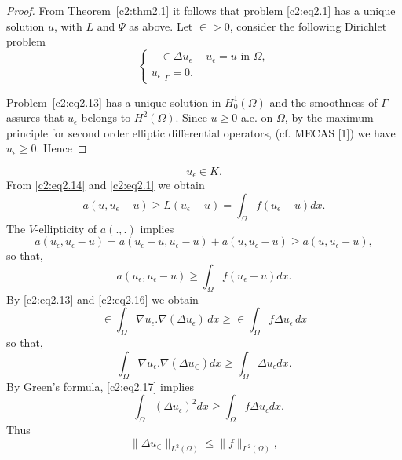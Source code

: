 \begin{proof}
From Theorem~\ref{c2:thm2.1} it follows that problem \eqref{c2:eq2.1}
has a unique solution 
$u$, with $L$ and $\Psi$ as above. Let $\in > 0$, consider the
following Dirichlet problem  
\begin{equation}
\begin{cases}
- \in \Delta u_\epsilon  + u_\epsilon =  u \text { in } \Omega,\\
u_\epsilon |_\Gamma = 0.
\end{cases}\tag{2.13}\label{c2:eq2.13} 
\end{equation}

Problem~\eqref{c2:eq2.13} has a unique solution in $H^1_0 (\Omega)$
and the smoothness of $\Gamma$ assures that $u_\epsilon$ belongs to
$H^2(\Omega)$. Since $u \geq 0$ a.e. on $\Omega$, by the maximum
principle for second order elliptic differential operators, (cf. MECAS
[1]) we have  $u_\epsilon \geq 0$. Hence 
\end{proof}
\begin{equation}
u_\epsilon  \in K. \tag{2.14}\label{c2:eq2.14}
\end{equation} 
From \eqref{c2:eq2.14} and \eqref{c2:eq2.1} we obtain
\begin{equation}
a(u, u_\epsilon - u) \geq L (u_\epsilon - u) = \int_\Omega f
(u_\epsilon - u) dx. \tag{2.15}\label{c2:eq2.15} 
\end{equation}
The $V$-ellipticity of $a(.,.)$ implies
$$
a(u_\epsilon , u_\epsilon - u) = a(u_\epsilon - u, u_\epsilon - u) + a
(u, u_\epsilon -u) \geq a(u, u_\epsilon - u), 
$$  
so that,
\begin{equation}
a(u_\epsilon , u_\epsilon - u) \geq \int_\Omega f (u_\epsilon - u)
dx.\tag{2.16}\label{c2:eq2.16} 
\end{equation}
By \eqref{c2:eq2.13} and \eqref{c2:eq2.16} we obtain 
$$
\in \int_\Omega \nabla u_\epsilon . \nabla
(\Delta u_\epsilon )\,dx \geq \in \int_\Omega f \Delta u_\epsilon \,dx  
$$
so that,\pageoriginale 
\begin{equation}
\int_\Omega \nabla u_\epsilon. \nabla (\Delta
u_\in) dx \geq \int_\Omega \Delta u_\epsilon dx.\tag{2.17}\label{c2:eq2.17} 
\end{equation}
By Green's formula, \eqref{c2:eq2.17} implies
$$
-\int_\Omega (\Delta u_\epsilon )^2 dx \geq \int_\Omega f \Delta
u_\epsilon dx. 
$$
Thus 
\begin{equation}
\parallel  \Delta u_{\in} \parallel  _{L^2 (\Omega)} \leq \parallel  f \parallel_{L^2(\Omega)},
\tag{2.18}\label{c2:eq2.18} 
\end{equation} 
